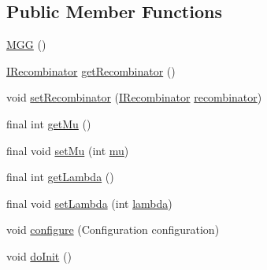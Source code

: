 \subsection*{Public Member Functions}
\begin{DoxyCompactItemize}
\item 
\hyperlink{classnet_1_1sf_1_1jclec_1_1algorithm_1_1gengap_1_1_m_g_g_a0451e885cf02b2dce9e71a7a0987243a}{M\-G\-G} ()
\item 
\hyperlink{interfacenet_1_1sf_1_1jclec_1_1_i_recombinator}{I\-Recombinator} \hyperlink{classnet_1_1sf_1_1jclec_1_1algorithm_1_1gengap_1_1_m_g_g_a1a2aebddf4088f13b555a76a6abe9a3b}{get\-Recombinator} ()
\item 
void \hyperlink{classnet_1_1sf_1_1jclec_1_1algorithm_1_1gengap_1_1_m_g_g_a26afb4642bfef39bce4452d4bcdd81c4}{set\-Recombinator} (\hyperlink{interfacenet_1_1sf_1_1jclec_1_1_i_recombinator}{I\-Recombinator} \hyperlink{classnet_1_1sf_1_1jclec_1_1algorithm_1_1gengap_1_1_m_g_g_a9766f8cca6d32372c8570b7d3c5e6a8c}{recombinator})
\item 
final int \hyperlink{classnet_1_1sf_1_1jclec_1_1algorithm_1_1gengap_1_1_m_g_g_a144bd9b034665ff8eb744a5f442c0b66}{get\-Mu} ()
\item 
final void \hyperlink{classnet_1_1sf_1_1jclec_1_1algorithm_1_1gengap_1_1_m_g_g_ac302393f1ed286a2399d000abecb9d7b}{set\-Mu} (int \hyperlink{classnet_1_1sf_1_1jclec_1_1algorithm_1_1gengap_1_1_m_g_g_a54d54ef80c76a0f17b073e6ccfa4dc59}{mu})
\item 
final int \hyperlink{classnet_1_1sf_1_1jclec_1_1algorithm_1_1gengap_1_1_m_g_g_a39a6355e2501eb2a4ada352303b1c752}{get\-Lambda} ()
\item 
final void \hyperlink{classnet_1_1sf_1_1jclec_1_1algorithm_1_1gengap_1_1_m_g_g_a649758b45cf38be678544b563b2b7099}{set\-Lambda} (int \hyperlink{classnet_1_1sf_1_1jclec_1_1algorithm_1_1gengap_1_1_m_g_g_a9ff16764aaa1eac1638b346e5e847725}{lambda})
\item 
void \hyperlink{classnet_1_1sf_1_1jclec_1_1algorithm_1_1gengap_1_1_m_g_g_a7125d7f804373d684e556d08f435ee43}{configure} (Configuration configuration)
\item 
void \hyperlink{classnet_1_1sf_1_1jclec_1_1algorithm_1_1gengap_1_1_m_g_g_a1f3e97ac852d30a6e42f1f8a95d8b624}{do\-Init} ()
\end{DoxyCompactItemize}
